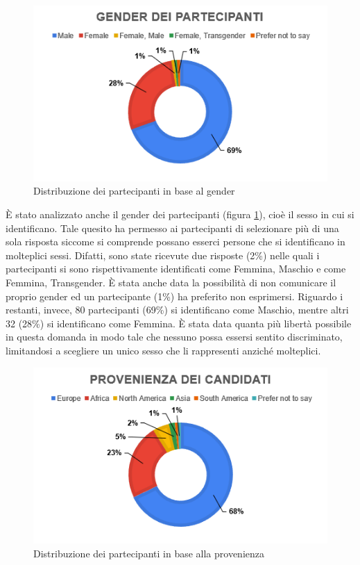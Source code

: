 \begin{figure}[h!]
    \centering
    \includegraphics[width=1\textwidth]{figure/data-analysis/gender.png}
    \caption{Distribuzione dei partecipanti in base al gender}
    \label{im-a-part-2}
\end{figure}

È stato analizzato anche il gender dei partecipanti (figura \ref{im-a-part-2}), cioè il sesso in cui si identificano. Tale quesito ha permesso ai partecipanti di selezionare più di una sola risposta siccome si comprende possano esserci persone che si identificano in molteplici sessi. Difatti, sono state ricevute due risposte (2\%) nelle quali i partecipanti si sono rispettivamente identificati come Femmina, Maschio e come Femmina, Transgender. È stata anche data la possibilità di non comunicare il proprio gender ed un partecipante (1\%) ha preferito non esprimersi. Riguardo i restanti, invece, 80 partecipanti (69\%) si identificano come Maschio, mentre altri 32 (28\%) si identificano come Femmina. È stata data quanta più libertà possibile in questa domanda in modo tale che nessuno possa essersi sentito discriminato, limitandosi a scegliere un unico sesso che li rappresenti anziché molteplici.\\

\begin{figure}[h!]
    \centering
    \includegraphics[width=1\textwidth]{figure/data-analysis/prov.png}
    \caption{Distribuzione dei partecipanti in base alla provenienza}
    \label{im-a-part-3}
\end{figure}

